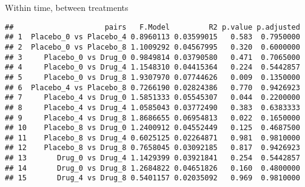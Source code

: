 \documentclass[]{article}
\newenvironment{Shaded}{\begin{snugshade}}{\end{snugshade}}
\newcommand{\KeywordTok}[1]{\textcolor[rgb]{0.13,0.29,0.53}{\textbf{#1}}}
\newcommand{\DataTypeTok}[1]{\textcolor[rgb]{0.13,0.29,0.53}{#1}}
\newcommand{\StringTok}[1]{\textcolor[rgb]{0.31,0.60,0.02}{#1}}
\newcommand{\OtherTok}[1]{\textcolor[rgb]{0.56,0.35,0.01}{#1}}
\newcommand{\OperatorTok}[1]{\textcolor[rgb]{0.81,0.36,0.00}{\textbf{#1}}}
\newcommand{\NormalTok}[1]{#1}
\begin{document}
Within time, between treatments

\begin{Shaded}
\end{Shaded}

\begin{verbatim}
##                     pairs   F.Model         R2 p.value p.adjusted
## 1  Placebo_0 vs Placebo_4 0.8960113 0.03599015   0.583  0.7950000
## 2  Placebo_0 vs Placebo_8 1.1009292 0.04567995   0.320  0.6000000
## 3     Placebo_0 vs Drug_0 0.9849814 0.03790580   0.471  0.7065000
## 4     Placebo_0 vs Drug_4 1.1548310 0.04415364   0.224  0.5442857
## 5     Placebo_0 vs Drug_8 1.9307970 0.07744626   0.009  0.1350000
## 6  Placebo_4 vs Placebo_8 0.7266190 0.02824386   0.770  0.9426923
## 7     Placebo_4 vs Drug_0 1.5851333 0.05545307   0.044  0.2200000
## 8     Placebo_4 vs Drug_4 1.0585043 0.03772490   0.383  0.6383333
## 9     Placebo_4 vs Drug_8 1.8686655 0.06954813   0.022  0.1650000
## 10    Placebo_8 vs Drug_0 1.2400912 0.04552449   0.125  0.4687500
## 11    Placebo_8 vs Drug_4 0.6025125 0.02264871   0.981  0.9810000
## 12    Placebo_8 vs Drug_8 0.7658045 0.03092185   0.817  0.9426923
## 13       Drug_0 vs Drug_4 1.1429399 0.03921841   0.254  0.5442857
## 14       Drug_0 vs Drug_8 1.2684822 0.04651826   0.160  0.4800000
## 15       Drug_4 vs Drug_8 0.5401157 0.02035092   0.969  0.9810000
\end{verbatim}

\begin{Shaded}
\end{Shaded}
\end{document}
